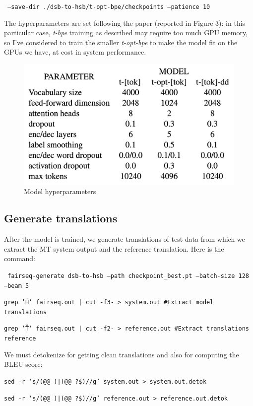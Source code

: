 \documentclass[12pt]{article}
\begin{document}
\texttt{ --save-dir ./dsb-to-hsb/t-opt-bpe/checkpoints --patience 10}

\newpage

The hyperparameters are set following the paper (reported in Figure 3):
in this particular case, \textit{t-bpe} training as described
may require too much GPU memory, so I've considered to train the smaller \textit{t-opt-bpe} to make the model fit on the GPUs we have, at cost in system performance.

\begin{figure}
    \centering
    \includegraphics[width=0.7\linewidth]{./figures/hyperparameters.png}
    \caption{Model hyperparameters}
    \label{fig:hyperparameters}
\end{figure}

\subsection{Generate translations}
After the model is trained, we generate translations of test data from which we extract the MT system output and the reference translation. Here is the command:

\vspace{0.2cm}
\texttt{
fairseq-generate dsb-to-hsb --path checkpoint\_best.pt --batch-size 128 --beam 5}

\vspace{0.2cm}
\texttt{grep '\^H' fairseq.out | cut -f3- > system.out \#Extract model translations}

\texttt{grep '\^T' fairseq.out | cut -f2- > reference.out \#Extract translations reference}

\vspace{0.2cm}
We must detokenize for getting clean translations and also for computing the BLEU score:

\vspace{0.2cm}
\texttt{sed -r 's/(@@ )|(@@ ?\$)//g' system.out > system.out.detok}

\texttt{sed -r 's/(@@ )|(@@ ?\$)//g' reference.out > reference.out.detok}
\end{document}
